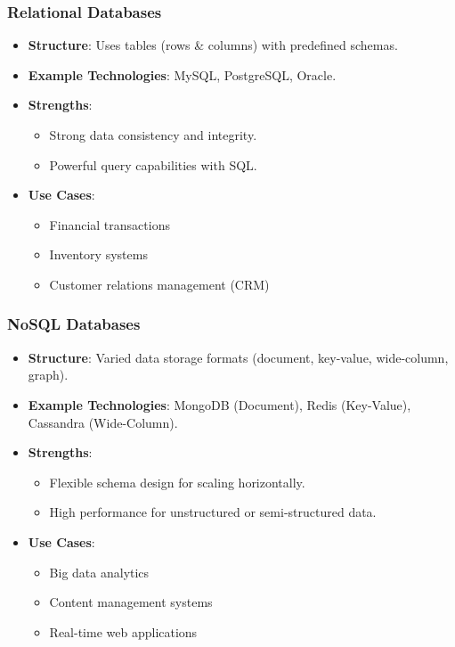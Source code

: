 \documentclass[aspectratio=169]{beamer}
\begin{document}
\begin{frame}[fragile]
    \frametitle{Relational Databases}
    \begin{itemize}
        \item \textbf{Structure}: Uses tables (rows \& columns) with predefined schemas.
        \item \textbf{Example Technologies}: MySQL, PostgreSQL, Oracle.
        \item \textbf{Strengths}:
        \begin{itemize}
            \item Strong data consistency and integrity.
            \item Powerful query capabilities with SQL.
        \end{itemize}
        \item \textbf{Use Cases}:
        \begin{itemize}
            \item Financial transactions
            \item Inventory systems
            \item Customer relations management (CRM)
        \end{itemize}
    \end{itemize}
\end{frame}

\begin{frame}[fragile]
    \frametitle{NoSQL Databases}
    \begin{itemize}
        \item \textbf{Structure}: Varied data storage formats (document, key-value, wide-column, graph).
        \item \textbf{Example Technologies}: MongoDB (Document), Redis (Key-Value), Cassandra (Wide-Column).
        \item \textbf{Strengths}:
        \begin{itemize}
            \item Flexible schema design for scaling horizontally.
            \item High performance for unstructured or semi-structured data.
        \end{itemize}
        \item \textbf{Use Cases}:
        \begin{itemize}
            \item Big data analytics
            \item Content management systems
            \item Real-time web applications
        \end{itemize}
    \end{itemize}
\end{frame}
\end{document}
